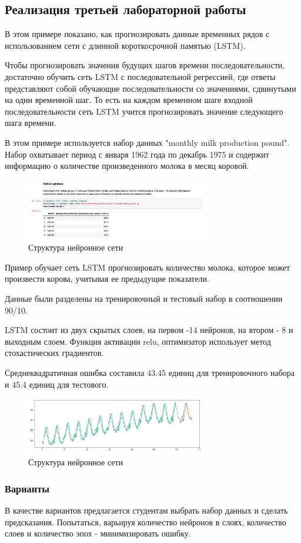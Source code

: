 \subsection{Реализация третьей лабораторной работы}

В этом примере показано, как прогнозировать данные временных рядов с использованием сети с длинной короткосрочной  памятью (LSTM).

Чтобы прогнозировать значения будущих шагов времени последовательности, достаточно обучить сеть LSTM с последовательной регрессией, где ответы представляют собой обучающие последовательности со значениями, сдвинутыми на один временной шаг. То есть на каждом временном шаге входной последовательности сеть LSTM учится прогнозировать значение следующего шага времени.

В этом примере используется набор данных "monthly milk production pound". Набор охватывает период с января 1962 года по декабрь 1975 и содержит информацию о количестве произведенного молока в месяц коровой.

\begin{figure}[htbp]
	\centering
	\includegraphics[width=0.7\textwidth]{fig/milk}
	\caption{Структура нейронное сети}%
	\label{fig:milk}
\end{figure}


Пример обучает сеть LSTM прогнозировать количество молока, которое может произвести корова, учитывая ее предыдущие показатели.

Данные были разделены на тренировочный и тестовый набор в соотношении 90/10.

LSTM состоит из двух скрытых слоев, на первом -14 нейронов, на втором - 8 и выходным слоем. Функция активации relu, оптимизатор использует метод стохастических градиентов.

Среднеквадратичная ошибка составила 43.45 единиц  для тренировочного набора и 45.4 единиц для тестового.


\begin{figure}[htbp]
	\centering
	\includegraphics[width=0.7\textwidth]{fig/predict}
	\caption{Структура нейронное сети}%
	\label{fig:predict}
\end{figure}


\subsubsection{Варианты}
В качестве вариантов предлагается студентам выбрать набор данных и сделать предсказания. Попытаться, варьируя количество нейронов в слоях, количество слоев и количество эпох - минимизировать ошибку.


